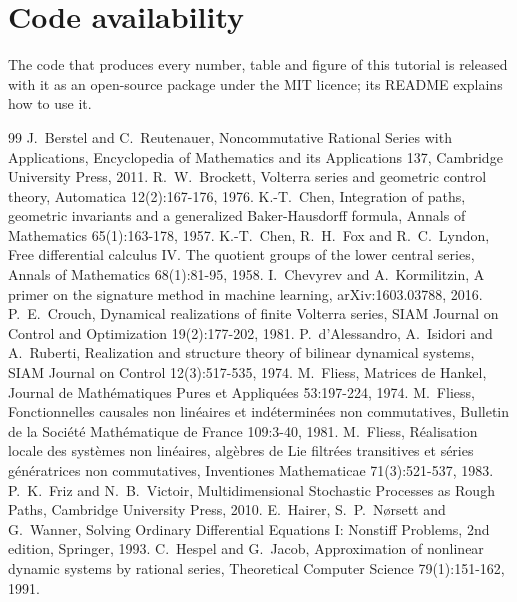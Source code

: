 \documentclass[11pt,a4paper]{article}
\theoremstyle{remark}
\begin{document}
\section*{Code availability}
The code that produces every number, table and figure of this tutorial is released with it as an open-source package under the MIT licence; its README explains how to use it.

\begin{thebibliography}{99}
 J.~Berstel and C.~Reutenauer, Noncommutative Rational Series with Applications, Encyclopedia of Mathematics and its Applications 137, Cambridge University Press, 2011.
 R.~W.~Brockett, Volterra series and geometric control theory, Automatica 12(2):167-176, 1976.
 K.-T.~Chen, Integration of paths, geometric invariants and a generalized Baker-Hausdorff formula, Annals of Mathematics 65(1):163-178, 1957.
 K.-T.~Chen, R.~H.~Fox and R.~C.~Lyndon, Free differential calculus IV. The quotient groups of the lower central series, Annals of Mathematics 68(1):81-95, 1958.
 I.~Chevyrev and A.~Kormilitzin, A primer on the signature method in machine learning, arXiv:1603.03788, 2016.
 P.~E.~Crouch, Dynamical realizations of finite Volterra series, SIAM Journal on Control and Optimization 19(2):177-202, 1981.
 P.~d'Alessandro, A.~Isidori and A.~Ruberti, Realization and structure theory of bilinear dynamical systems, SIAM Journal on Control 12(3):517-535, 1974.
 M.~Fliess, Matrices de Hankel, Journal de Math\'ematiques Pures et Appliqu\'ees 53:197-224, 1974.
 M.~Fliess, Fonctionnelles causales non lin\'eaires et ind\'etermin\'ees non commutatives, Bulletin de la Soci\'et\'e Math\'ematique de France 109:3-40, 1981.
 M.~Fliess, R\'ealisation locale des syst\`emes non lin\'eaires, alg\`ebres de Lie filtr\'ees transitives et s\'eries g\'en\'eratrices non commutatives, Inventiones Mathematicae 71(3):521-537, 1983.
 P.~K.~Friz and N.~B.~Victoir, Multidimensional Stochastic Processes as Rough Paths, Cambridge University Press, 2010.
 E.~Hairer, S.~P.~N{\o}rsett and G.~Wanner, Solving Ordinary Differential Equations I: Nonstiff Problems, 2nd edition, Springer, 1993.
 C.~Hespel and G.~Jacob, Approximation of nonlinear dynamic systems by rational series, Theoretical Computer Science 79(1):151-162, 1991.

\end{thebibliography}
\end{document}
